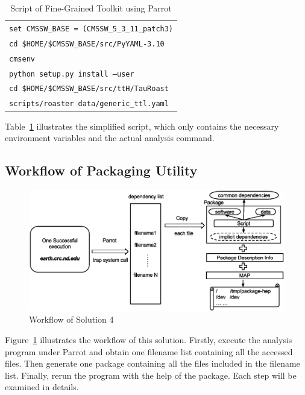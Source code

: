 \documentclass{sig-alternate}
\begin{document}
\begin{table}
    \centering
    \begin{tabular}{|l|}
        \hline
        {\tt set CMSSW\_BASE = (CMSSW\_5\_3\_11\_patch3)} \\
        {\tt cd \$HOME/\$CMSSW\_BASE/src/PyYAML-3.10}\\
        {\tt cmsenv} \\
        {\tt python setup.py install --user} \\
        {\tt cd \$HOME/\$CMSSW\_BASE/src/ttH/TauRoast}\\
        {\tt scripts/roaster data/generic\_ttl.yaml} \\
        \hline
    \end{tabular}
    \caption{Script of Fine-Grained Toolkit using Parrot}
    \label{table:parrot-script}
\end{table}

Table~\ref{table:parrot-script} illustrates
the simplified script, which
only contains the necessary environment variables and the
actual analysis command.

\subsection{Workflow of Packaging Utility}
\begin{figure}
\centering
\includegraphics[width=1.6\columnwidth]{workflow-parrot.eps}
\caption{Workflow of Solution 4}
\label{fig:workflow-parrot}
\end{figure}

Figure~\ref{fig:workflow-parrot} illustrates the workflow of this solution. Firstly, execute the analysis program under Parrot and obtain one filename list containing all the accessed files. Then generate one package containing all the files included in the filename list. Finally, rerun the program with the help of the package. Each step will be examined in details.
\end{document}
